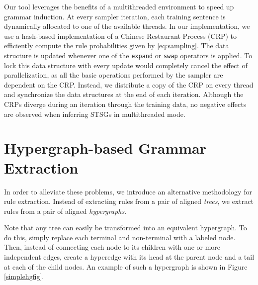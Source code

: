 \documentclass[nofonts]{pbml} %
\begin{document}
Our tool leverages the benefits of a multithreaded environment to speed up grammar induction. At every sampler iteration, each training sentence is dynamically allocated to one of the available threads. In our implementation, we use a hash-based implementation of a Chinese Restaurant Process (CRP) \citep{Teh2010} to efficiently compute the rule probabilities given by \autoref{eq:sampling}. The data structure is updated whenever one of the \texttt{expand} or \texttt{swap} operators is applied. To lock this data structure with every update would completely cancel the effect of parallelization, as all the basic operations performed by the sampler are dependent on the CRP. Instead, we distribute a copy of the CRP on every thread and synchronize the data structures at the end of each iteration. Although the CRPs diverge during an iteration through the training data, no negative effects are observed when inferring STSGs in multithreaded mode.

\section{Hypergraph-based Grammar Extraction}
In order to alleviate these problems, we introduce an alternative methodology for rule extraction.
Instead of extracting rules from a pair of aligned \emph{trees}, we extract rules from a pair of
aligned \emph{hypergraphs}.

Note that any tree can easily be transformed into an equivalent hypergraph. To do this, simply replace
each terminal and non-terminal with a labeled node. Then, instead of connecting each node to its children
with one or more independent edges, create a hyperedge with its head at the parent node and a tail at each
of the child nodes. An example of such a hypergraph is shown in Figure \ref{simplehgfig}.
\end{document}
